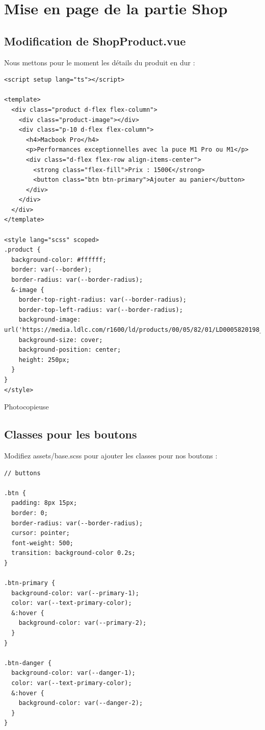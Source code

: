 \documentclass{article}
\begin{document}


\section{Mise en page de la partie Shop}
\subsection{Modification de {\color{monOrange}ShopProduct.vue}}
Nous mettons pour le moment les détails du produit en dur :
\begin{verbatim}
<script setup lang="ts"></script>

<template>
  <div class="product d-flex flex-column">
    <div class="product-image"></div>
    <div class="p-10 d-flex flex-column">
      <h4>Macbook Pro</h4>
      <p>Performances exceptionnelles avec la puce M1 Pro ou M1</p>
      <div class="d-flex flex-row align-items-center">
        <strong class="flex-fill">Prix : 1500€</strong>
        <button class="btn btn-primary">Ajouter au panier</button>
      </div>
    </div>
  </div>
</template>

<style lang="scss" scoped>
.product {
  background-color: #ffffff;
  border: var(--border);
  border-radius: var(--border-radius);
  &-image {
    border-top-right-radius: var(--border-radius);
    border-top-left-radius: var(--border-radius);
    background-image: url('https://media.ldlc.com/r1600/ld/products/00/05/82/01/LD0005820198_1.jpg');
    background-size: cover;
    background-position: center;
    height: 250px;
  }
}
</style>
\end{verbatim}

Photocopieuse
\subsection{Classes pour les boutons}
Modifiez {\color{monOrange}assets/base.scss} pour ajouter les classes pour nos boutons :
\begin{verbatim}
// buttons

.btn {
  padding: 8px 15px;
  border: 0;
  border-radius: var(--border-radius);
  cursor: pointer;
  font-weight: 500;
  transition: background-color 0.2s;
}

.btn-primary {
  background-color: var(--primary-1);
  color: var(--text-primary-color);
  &:hover {
    background-color: var(--primary-2);
  }
}

.btn-danger {
  background-color: var(--danger-1);
  color: var(--text-primary-color);
  &:hover {
    background-color: var(--danger-2);
  }
}
\end{verbatim}
\end{document}
